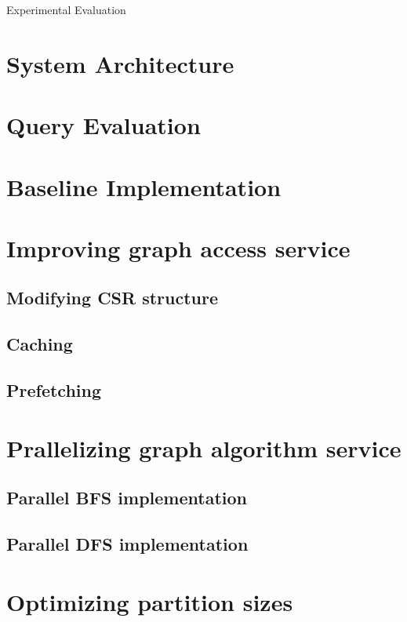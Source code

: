 Experimental Evaluation
\section{System Architecture}\label{sec:sysArch}
\section{Query Evaluation}\label{sec:queryEvaluation}
\section{Baseline Implementation}\label{sec:baseline}
\section{Improving graph access service}\label{sec:impGraphAccess}
\subsection{Modifying CSR structure}
\subsection{Caching}
\subsection{Prefetching}
\section{Prallelizing graph algorithm service}\label{sec:parallelAlgorithms}
\subsection{Parallel BFS implementation}
\subsection{Parallel DFS implementation}
\section{Optimizing partition sizes}\label{sec:partitionSize}
